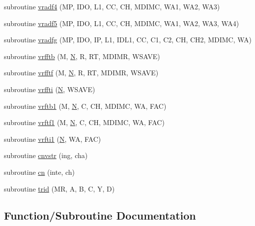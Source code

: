 \begin{DoxyCompactItemize}
subroutine \hyperlink{sfft_8f_a806321a80ed418620c4860fc17ce72e0}{vradf4} (MP, I\+DO, L1, CC, CH, M\+D\+I\+MC, W\+A1, W\+A2, W\+A3)
\item 
subroutine \hyperlink{sfft_8f_a0aec689c9487c752ec61e9d3692b2c12}{vradf5} (MP, I\+DO, L1, CC, CH, M\+D\+I\+MC, W\+A1, W\+A2, W\+A3, W\+A4)
\item 
subroutine \hyperlink{sfft_8f_a986cb0f6dcbd2acd1e2a4e9ef22d67c2}{vradfg} (MP, I\+DO, IP, L1, I\+D\+L1, CC, C1, C2, CH, C\+H2, M\+D\+I\+MC, WA)
\item 
subroutine \hyperlink{sfft_8f_a3d6b11e474dd9bb984ac4054ddab2c34}{vrfftb} (M, \hyperlink{mc__gpu_8cu_ab2b6b0c222cd1ce70d6a831f57241e59}{N}, R, RT, M\+D\+I\+MR, W\+S\+A\+VE)
\item 
subroutine \hyperlink{sfft_8f_a12a99635a0a55f46d7332f7edf41fecb}{vrfftf} (M, \hyperlink{mc__gpu_8cu_ab2b6b0c222cd1ce70d6a831f57241e59}{N}, R, RT, M\+D\+I\+MR, W\+S\+A\+VE)
\item 
subroutine \hyperlink{sfft_8f_a5c99760521da8176c787bb9c97496a52}{vrffti} (\hyperlink{mc__gpu_8cu_ab2b6b0c222cd1ce70d6a831f57241e59}{N}, W\+S\+A\+VE)
\item 
subroutine \hyperlink{sfft_8f_a67a1e9e0f31cb6a7c668c544acd5ed81}{vrftb1} (M, \hyperlink{mc__gpu_8cu_ab2b6b0c222cd1ce70d6a831f57241e59}{N}, C, CH, M\+D\+I\+MC, WA, F\+AC)
\item 
subroutine \hyperlink{sfft_8f_a7da099aef7dae58a938aa6ddc20fb28d}{vrftf1} (M, \hyperlink{mc__gpu_8cu_ab2b6b0c222cd1ce70d6a831f57241e59}{N}, C, CH, M\+D\+I\+MC, WA, F\+AC)
\item 
subroutine \hyperlink{sfft_8f_a48b013eedb6ac3aa95d12d241e2787e3}{vrfti1} (\hyperlink{mc__gpu_8cu_ab2b6b0c222cd1ce70d6a831f57241e59}{N}, WA, F\+AC)
\item 
subroutine \hyperlink{sfft_8f_a793beaf15d43aba14940d2e3dc11ba2b}{cnvstr} (ing, cha)
\item 
subroutine \hyperlink{sfft_8f_afc408da45c97e3807dba8a6454fc374c}{cn} (inte, ch)
\item 
subroutine \hyperlink{sfft_8f_a4a0181d25fb290774bee46dec85265ff}{trid} (MR, A, B, C, Y, D)
\end{DoxyCompactItemize}


\subsection{Function/\+Subroutine Documentation}
\mbox{\label{sfft_8f_afc408da45c97e3807dba8a6454fc374c}} 

